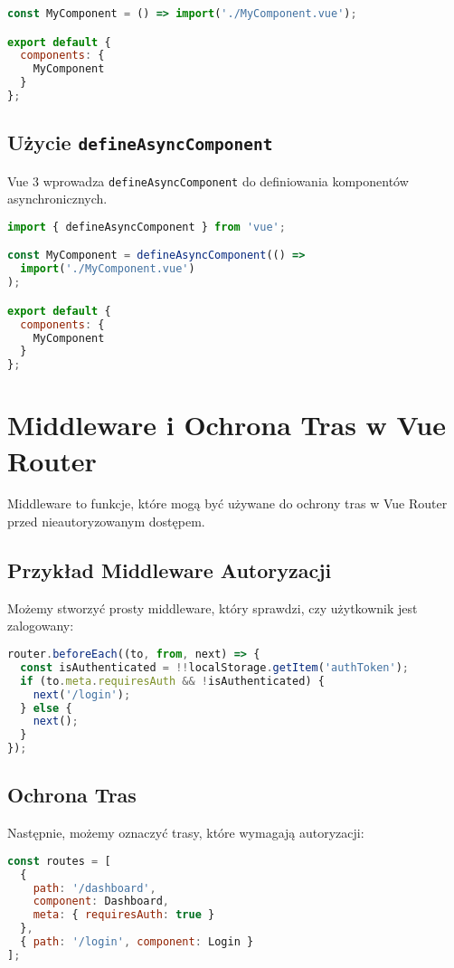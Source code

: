 \documentclass[a4paper,12pt]{article}
\begin{document}
\begin{lstlisting}[language=JavaScript]
const MyComponent = () => import('./MyComponent.vue');

export default {
  components: {
    MyComponent
  }
};
\end{lstlisting}

\subsection{Użycie \texttt{defineAsyncComponent}}
Vue 3 wprowadza \texttt{defineAsyncComponent} do definiowania komponentów asynchronicznych.

\begin{lstlisting}[language=JavaScript]
import { defineAsyncComponent } from 'vue';

const MyComponent = defineAsyncComponent(() =>
  import('./MyComponent.vue')
);

export default {
  components: {
    MyComponent
  }
};
\end{lstlisting}

\section{Middleware i Ochrona Tras w Vue Router}
Middleware to funkcje, które mogą być używane do ochrony tras w Vue Router przed nieautoryzowanym dostępem.

\subsection{Przykład Middleware Autoryzacji}
Możemy stworzyć prosty middleware, który sprawdzi, czy użytkownik jest zalogowany:

\begin{lstlisting}[language=JavaScript]
router.beforeEach((to, from, next) => {
  const isAuthenticated = !!localStorage.getItem('authToken');
  if (to.meta.requiresAuth && !isAuthenticated) {
    next('/login');
  } else {
    next();
  }
});
\end{lstlisting}

\subsection{Ochrona Tras}
Następnie, możemy oznaczyć trasy, które wymagają autoryzacji:

\begin{lstlisting}[language=JavaScript]
const routes = [
  {
    path: '/dashboard',
    component: Dashboard,
    meta: { requiresAuth: true }
  },
  { path: '/login', component: Login }
];
\end{lstlisting}
\end{document}
